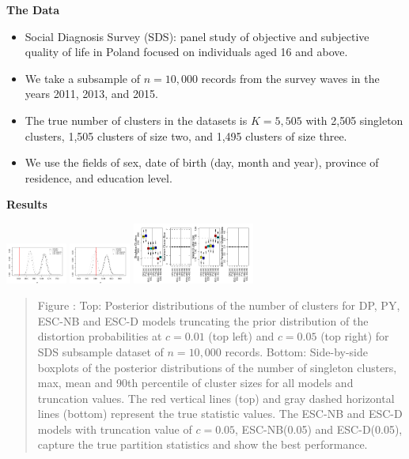 \documentclass[portrait,a0b,final]{a0poster}
\newenvironment{poster}{
  \begin{center}
  \begin{minipage}[c]{0.98\textwidth}
}{
  \end{minipage}
  \end{center}
}
\newcommand{\mycaption}[1]{
  \vspace{0.25cm}
  \begin{quote}
    {{\sc Figure} \arabic{figure}: #1}
  \end{quote}
  \vspace{0.25cm}
  \stepcounter{figure}
}
\begin{document}
\begin{poster}
\begin{multicols}{3}
\begin{center}
\textbf{The Data}
\end{center}

\begin{itemize}
\item Social Diagnosis Survey (SDS): panel study of objective and subjective quality of life in Poland focused on individuals aged 16 and above. 
\item  We take a subsample of $n=10,000$ records from the survey waves in the years 2011, 2013, and 2015. 
\item The true number of clusters in the datasets is $K= 5,505$ with 2,505 singleton clusters, 1,505 clusters of size two, and 1,495 clusters of size three.
\item We use the fields of sex, date of birth (day, month and year), province of residence, and education level.
\end{itemize}

\begin{center}
\textbf{Results}
\end{center}

\begin{center}
\includegraphics[width=0.15\textwidth]{poland/Kpost_poland10k_nostat_ParChapTrunc1p}
\vspace{-1cm}
\includegraphics[width=0.15\textwidth]{poland/Kpost_poland10k_nostat_ParChapTrunc5p}
\vspace{-1cm}
\includegraphics[width=0.3\textwidth]{poland/Stats_poland10k_nostat_ParChapTrunc}
\mycaption{Top: Posterior distributions of the number of clusters for DP, PY, ESC-NB and ESC-D models truncating the prior distribution of the distortion probabilities at $c=0.01$ (top left) and $c=0.05$ (top right) for SDS subsample dataset of $n=10,000$ records. Bottom: Side-by-side boxplots of the posterior distributions of the number of singleton clusters, max, mean and 90th percentile of cluster sizes for all models and truncation values. The red vertical lines (top) and gray dashed horizontal lines (bottom) represent the true statistic values. The ESC-NB and ESC-D models with truncation value of $c=0.05$, ESC-NB(0.05) and ESC-D(0.05), capture the true partition statistics and show the best performance.} 
\end{center}


\end{multicols}
\end{poster}
\end{document}
